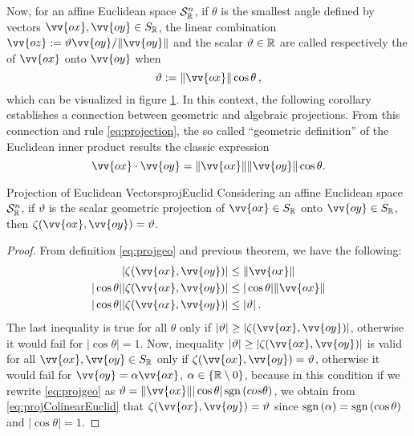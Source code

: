 Now, for an affine Euclidean space $\eamd{S}{R}{n}$, if $\theta$ is the smallest angle defined by vectors $\vv{ox},\vv{oy}\in S_\cam{R}$, the linear combination  $\vv{oz}:=\vartheta\vv{oy}/\|\vv{oy}\|$ and the scalar $\vartheta\in\real$ are called respectively the  of $\vv{ox}$ onto $\vv{oy}$ when
\begin{equation}\label{eq:projgeo}
\vartheta:=\|\vv{ox}\|\cos\theta\,,
\end{equation}
which can be visualized in figure \ref{fg:geoProject}. In this context, the following corollary establishes a connection between geometric and algebraic projections. From this connection and rule \eqref{eq:projection}, the so called ``geometric definition'' of the Euclidean inner product results the classic expression
\begin{equation}\label{eq:geoProdInt}
\vv{ox}\cdot\vv{oy}=\|\vv{ox}\|\|\vv{oy}\|\cos\theta.
\end{equation}
\begin{figure}[!ht]
	\centering
	\begin{center}
		\scalebox{.72}{}
	\end{center}
	\label{fg:geoProject}
\end{figure}

\begin{mcoro}{Projection of Euclidean Vectors}{projEuclid}
Considering an affine Euclidean space $\eamd{S}{R}{n}$, if $\vartheta$ is the scalar geometric projection of $\vv{ox}\in S_\cam{R}$ onto $\vv{oy}\in S_\cam{R}$, then
$\fua{\zeta}{\vv{ox},\vv{oy}}=\vartheta$.
\end{mcoro}
\hspace{1pt}
{\footnotesize
\begin{proof}
From definition \eqref{eq:projgeo} and previous theorem, we have the following:
\begin{align*}
|\fua{\zeta}{\vv{ox},\vv{oy}}|&\leq\|\vv{ox}\|\\
|\cos\theta||\fua{\zeta}{\vv{ox},\vv{oy}}|&\leq|\cos\theta|\|\vv{ox}\|\\
|\cos\theta||\fua{\zeta}{\vv{ox},\vv{oy}}|&\leq|\vartheta|\,.
\end{align*}
The last inequality is true for all $\theta$ only if $|\vartheta|\geq|\fua{\zeta}{\vv{ox},\vv{oy}}|$, otherwise it would fail for $|\cos\theta|=1$. Now, inequality  $|\vartheta|\geq|\fua{\zeta}{\vv{ox},\vv{oy}}|$ is valid for all $\vv{ox},\vv{oy}\in S_\cam{R}$ only if $\fua{\zeta}{\vv{ox},\vv{oy}}=\vartheta$, otherwise it would fail for $\vv{oy}=\alpha\vv{ox}$, $\alpha\in\{\real\setminus 0\}$, because in this condition if we rewrite \eqref{eq:projgeo} as $\vartheta=\|\vv{ox}\||\cos\theta|\sgn{cos\theta}$, we obtain from \eqref{eq:projColinearEuclid} that $\fua{\zeta}{\vv{ox},\vv{oy}}=\vartheta$ since $\sgn{\alpha}=\sgn{\cos\theta}$ and $|\cos\theta|=1$.
\end{proof}}


